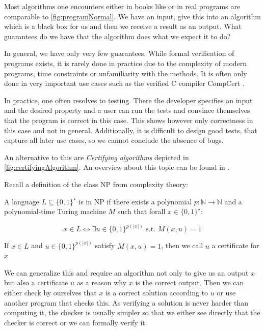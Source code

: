 Most algorithms one encounters either in books like \cite{AlgorithmsBook} or in real programs are comparable to \cref{fig:programNormal}. We have an input, give this into an algorithm which is a black box for us and then we receive a result as an output. What guarantees do we have that the algorithm does what we expect it to do?

In general, we have only very few guarantees. While formal verification of programs exists, it is rarely done in practice due to the complexity of modern programs, time constraints or unfamiliarity with the methods. It is often only done in very important use cases such as the verified C compiler CompCert \cite{CCertComp}.

In practice, one often resolves to testing. There the developer specifies an input and the desired property and a user can run the tests and convince themselves that the program is correct in this case. This shows however only correctness in this case and not in general. Additionally, it is difficult to design good tests, that capture all later use cases, so we cannot conclude the absence of bugs.

An alternative to this are \textit{Certifying algorithms} depicted in \cref{fig:certifyingAlgorithm}. An overview about this topic can be found in \cite{CertAlg}. 

Recall a definition of the class NP from complexity theory:

\begin{definition}
    A language $L \subseteq \{0,1\}^\star$ is in NP if there exists a polynomial $p: \mathbb{N} \to \mathbb{N}$ and a polynomial-time Turing machine $M$ such that forall $x \in \{0,1\}^\star$:

    \[ x \in L  \Leftrightarrow \exists u \in \{0,1\}^{p(|x|)}\text{ s.t. } M(x,u) = 1\]

    If $x \in L$ and $u \in \{0,1\}^{p(|x|)}$ satisfy $M(x,u) = 1$, then we call $u$ a certificate for $x$
\end{definition}

We can generalize this and require an algorithm not only to give us an output $x$ but also a certificate $u$ as a reason why $x$ is the correct output. Then we can either check by ourselves that $x$ is a correct solution according to $u$ or use another program that checks this. As verifying a solution is never harder than computing it, the checker is usually simpler so that we either see directly that the checker is correct or we can formally verify it.

